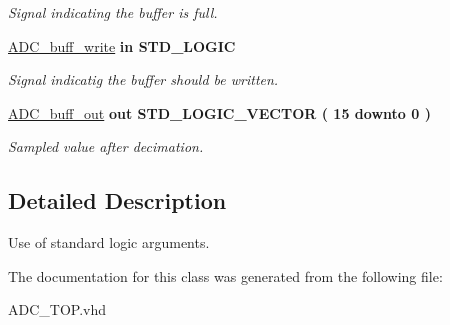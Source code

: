 \begin{DoxyCompactItemize}
\begin{DoxyCompactList}\small\item\em Signal indicating the buffer is full. \end{DoxyCompactList}\item 
\hypertarget{classADC__TOP_a854e269333aa7d7b4c2241ff9e71aaf2}{\hyperlink{classADC__TOP_a854e269333aa7d7b4c2241ff9e71aaf2}{A\-D\-C\-\_\-buff\-\_\-write}  {\bfseries {\bfseries \textcolor{vhdlkeyword}{in}\textcolor{vhdlchar}{ }}} {\bfseries \textcolor{comment}{S\-T\-D\-\_\-\-L\-O\-G\-I\-C}\textcolor{vhdlchar}{ }} }\label{classADC__TOP_a854e269333aa7d7b4c2241ff9e71aaf2}

\begin{DoxyCompactList}\small\item\em Signal indicatig the buffer should be written. \end{DoxyCompactList}\item 
\hypertarget{classADC__TOP_a227e2ba1cceb52f292ef5768f933ba98}{\hyperlink{classADC__TOP_a227e2ba1cceb52f292ef5768f933ba98}{A\-D\-C\-\_\-buff\-\_\-out}  {\bfseries {\bfseries \textcolor{vhdlkeyword}{out}\textcolor{vhdlchar}{ }}} {\bfseries \textcolor{comment}{S\-T\-D\-\_\-\-L\-O\-G\-I\-C\-\_\-\-V\-E\-C\-T\-O\-R}\textcolor{vhdlchar}{ }\textcolor{vhdlchar}{(}\textcolor{vhdlchar}{ }\textcolor{vhdlchar}{ } \textcolor{vhdldigit}{15} \textcolor{vhdlchar}{ }\textcolor{vhdlchar}{ }\textcolor{vhdlchar}{ }\textcolor{vhdlkeyword}{downto}\textcolor{vhdlchar}{ }\textcolor{vhdlchar}{ }\textcolor{vhdlchar}{ } \textcolor{vhdldigit}{0} \textcolor{vhdlchar}{ }\textcolor{vhdlchar}{)}\textcolor{vhdlchar}{ }} }\label{classADC__TOP_a227e2ba1cceb52f292ef5768f933ba98}

\begin{DoxyCompactList}\small\item\em Sampled value after decimation. \end{DoxyCompactList}\end{DoxyCompactItemize}


\subsection{Detailed Description}
Use of standard logic arguments. 

The documentation for this class was generated from the following file\-:\begin{DoxyCompactItemize}
\item 
A\-D\-C\-\_\-\-T\-O\-P.\-vhd\end{DoxyCompactItemize}
